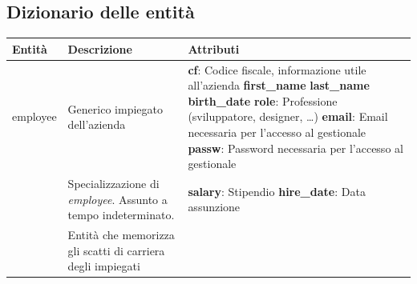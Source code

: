\subsection{Dizionario delle entità}
\begin{longtable}{@{}| p{} | p{} | p{} |}
	\hline
	Entità               & Descrizione                                                                                           & Attributi \\
	\hline
	employee             & \begin{minipage}[t]{0.4\textwidth}
		                       \raggedright
		                       Generico impiegato dell'azienda
	                       \end{minipage}
	                     & \begin{minipage}[t]{0.3\textwidth}
		                       \raggedright
		                       \textbf{cf}: Codice fiscale, informazione utile all'azienda\sskip
		                       \textbf{first\_name} \sskip
		                       \textbf{last\_name} \sskip
		                       \textbf{birth\_date} \sskip
		                       \textbf{role}: Professione (sviluppatore, designer, \dots)\sskip
		                       \textbf{email}: Email necessaria per l'accesso al gestionale\sskip
		                       \textbf{passw}: Password necessaria per l'accesso al gestionale
	                       \end{minipage}                                                 \\[140pt]
	\hline
	\baseemp             & \begin{minipage}[t]{0.4\textwidth}
		                       \raggedright
		                       Specializzazione di \textit{employee}. Assunto a tempo indeterminato.
	                       \end{minipage}
	                     & \begin{minipage}[t]{0.3\textwidth}
		                       \raggedright
		                       \textbf{salary}: Stipendio\sskip
		                       \textbf{hire\_date}: Data assunzione
	                       \end{minipage}                                                                               \\[20pt]
	\hline
	\careerlog           & \begin{minipage}[t]{0.4\textwidth}
		                       \raggedright
		                       Entità che memorizza gli scatti di carriera degli impiegati \textit{\baseemp}

\end{minipage}
\end{longtable}
